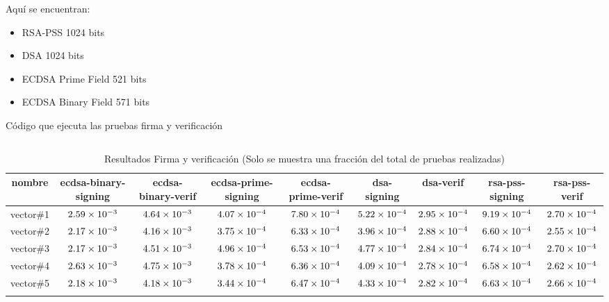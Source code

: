 \documentclass[../main.tex]{subfiles}
\begin{document}
Aquí se encuentran:
\begin{itemize}
  \item RSA-PSS 1024 bits
  \item DSA 1024 bits
  \item ECDSA Prime Field 521 bits
  \item ECDSA Binary Field 571 bits
\end{itemize}
\begin{code}
  \caption{Código que ejecuta las pruebas firma y verificación}\label{sec:firma-y-verificacion-1}
  \inputminted[lastline=149]{python}{../src/test_algoritmos_crypto/SignVerifTests.py}
\end{code}
\begin{table}[ht]
  \scriptsize
  \centering
  \caption{Resultados Firma y verificación (Solo se muestra una fracción del total de pruebas realizadas)}\label{tab:sign-res}
  \begin{tabular}{|c|c|c|c|c|c|c|c|c|}
    \hline
    \rowcolor[HTML]{000000}
    {\color[HTML]{FFFFFF} nombre} &
  {\color[HTML]{FFFFFF} ecdsa-binary-signing} &
  {\color[HTML]{FFFFFF} ecdsa-binary-verif} &
  {\color[HTML]{FFFFFF} ecdsa-prime-signing} &
  {\color[HTML]{FFFFFF} ecdsa-prime-verif} &
  {\color[HTML]{FFFFFF} dsa-signing} &
  {\color[HTML]{FFFFFF} dsa-verif} &
  {\color[HTML]{FFFFFF} rsa-pss-signing} &
  {\color[HTML]{FFFFFF} rsa-pss-verif} \\ \hline
    vector\#1  & $\num{2.59E-03}$ & $\num{4.64E-03}$ & $\num{4.07E-04}$ & $\num{7.80E-04}$ & $\num{5.22E-04}$ & $\num{2.95E-04}$ & $\num{9.19E-04}$ & $\num{2.70E-04}$ \\ \hline
    \rowcolor[HTML]{C0C0C0}
    vector\#2 & $\num{2.17E-03}$ & $\num{4.16E-03}$ & $\num{3.75E-04}$ & $\num{6.33E-04}$ & $\num{3.96E-04}$ & $\num{2.88E-04}$ & $\num{6.60E-04}$ & $\num{2.55E-04}$ \\ \hline
    vector\#3 & $\num{2.17E-03}$ & $\num{4.51E-03}$ & $\num{4.96E-04}$ & $\num{6.53E-04}$ & $\num{4.77E-04}$ & $\num{2.84E-04}$ & $\num{6.74E-04}$ & $\num{2.70 E-04}$ \\ \hline
    \rowcolor[HTML]{C0C0C0}
    vector\#4 & $\num{2.63E-03}$ & $\num{4.75E-03}$ & $\num{3.78E-04}$ & $\num{6.36E-04}$ & $\num{4.09E-04}$ & $\num{2.78E-04}$ & $\num{6.58E-04}$ & $\num{2.62E-04}$ \\ \hline
    vector\#5  & $\num{2.18E-03}$ & $\num{4.18E-03}$ & $\num{3.44E-04}$ & $\num{6.47E-04}$ & $\num{4.33E-04}$ & $\num{2.82E-04}$ & $\num{6.63E-04}$ & $\num{2.66E-04}$ \\ \hline
    \rowcolor[HTML]{C0C0C0}

\end{tabular}
\end{table}
\end{document}
